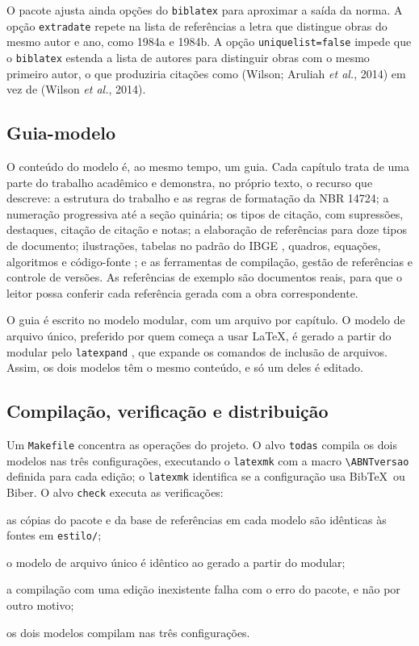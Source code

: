 \documentclass[
	article,
	12pt,
	oneside,
	a4paper,
	english,
	brazil,
]{abntex2}
\begin{document}
O pacote ajusta ainda opções do \texttt{biblatex} para aproximar a saída da norma. A opção \texttt{extradate} repete na lista de referências a letra que distingue obras do mesmo autor e ano, como 1984a e 1984b. A opção \texttt{uniquelist=false} impede que o \texttt{biblatex} estenda a lista de autores para distinguir obras com o mesmo primeiro autor, o que produziria citações como (Wilson; Aruliah \textit{et al.}, 2014) em vez de (Wilson \textit{et al.}, 2014).

\subsection{Guia-modelo}

O conteúdo do modelo é, ao mesmo tempo, um guia. Cada capítulo trata de uma parte do trabalho acadêmico e demonstra, no próprio texto, o recurso que descreve: a estrutura do trabalho e as regras de formatação da NBR 14724; a numeração progressiva até a seção quinária; os tipos de citação, com supressões, destaques, citação de citação e notas; a elaboração de referências para doze tipos de documento; ilustrações, tabelas no padrão do IBGE \cite{ibge1993}, quadros, equações, algoritmos e código-fonte \cite{minted}; e as ferramentas de compilação, gestão de referências e controle de versões. As referências de exemplo são documentos reais, para que o leitor possa conferir cada referência gerada com a obra correspondente.

O guia é escrito no modelo modular, com um arquivo por capítulo. O modelo de arquivo único, preferido por quem começa a usar \LaTeX, é gerado a partir do modular pelo \texttt{latexpand} \cite{latexpand}, que expande os comandos de inclusão de arquivos. Assim, os dois modelos têm o mesmo conteúdo, e só um deles é editado.

\subsection{Compilação, verificação e distribuição}

Um \texttt{Makefile} concentra as operações do projeto. O alvo \texttt{todas} compila os dois modelos nas três configurações, executando o \texttt{latexmk} com a macro \verb|\ABNTversao| definida para cada edição; o \texttt{latexmk} identifica se a configuração usa Bib\TeX\ ou Biber. O alvo \texttt{check} executa as verificações:

\begin{alineas}
	\item as cópias do pacote e da base de referências em cada modelo são idênticas às fontes em \texttt{estilo/};
	\item o modelo de arquivo único é idêntico ao gerado a partir do modular;
	\item a compilação com uma edição inexistente falha com o erro do pacote, e não por outro motivo;
	\item os dois modelos compilam nas três configurações.
\end{alineas}
\end{document}
